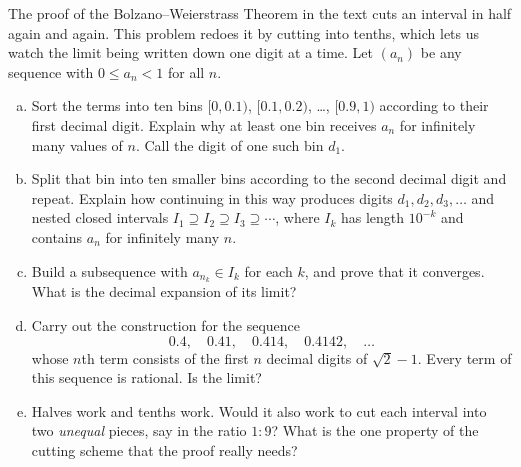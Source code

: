 \begin{problem}
The proof of the Bolzano--Weierstrass Theorem in the text cuts an interval in half again and again.  This problem redoes it by cutting into tenths, which lets us watch the limit being written down one digit at a time.  Let $(a_n)$ be any sequence with $0 \leq a_n < 1$ for all $n$.
\begin{enumerate}[(a)]
	\item Sort the terms into ten bins $[0, 0.1)$, $[0.1, 0.2)$, \ldots, $[0.9, 1)$ according to their first decimal digit.  Explain why at least one bin receives $a_n$ for infinitely many values of $n$.  Call the digit of one such bin $d_1$.
	\item Split that bin into ten smaller bins according to the second decimal digit and repeat.  Explain how continuing in this way produces digits $d_1, d_2, d_3, \ldots$ and nested closed intervals $I_1 \supseteq I_2 \supseteq I_3 \supseteq \cdots$, where $I_k$ has length $10^{-k}$ and contains $a_n$ for infinitely many $n$.
	\item Build a subsequence with $a_{n_k} \in I_k$ for each $k$, and prove that it converges.  What is the decimal expansion of its limit?
	\item Carry out the construction for the sequence
	\[ 0.4,\quad 0.41,\quad 0.414,\quad 0.4142,\quad \ldots \]
	whose $n$th term consists of the first $n$ decimal digits of $\sqrt{2} - 1$.  Every term of this sequence is rational.  Is the limit?
	\item Halves work and tenths work.  Would it also work to cut each interval into two \emph{unequal} pieces, say in the ratio $1:9$?  What is the one property of the cutting scheme that the proof really needs?
\end{enumerate}
\end{problem}


